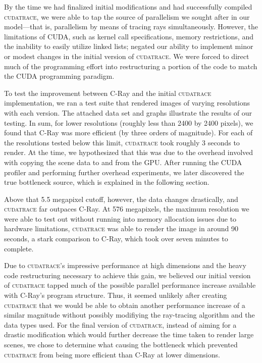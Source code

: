 \documentclass[12pt]{article}
\begin{document}
By the time we had finalized initial modifications and had successfully compiled \textsc{cudatrace}, we were able to tap the source of parallelism we sought after in our model---that is, parallelism by means of tracing rays simultaneously. However, the limitations of CUDA, such as kernel call specifications, memory restrictions, and the inability to easily utilize linked lists; negated our ability to implement minor or modest changes in the initial version of \textsc{cudatrace}. We were forced to direct much of the programming effort into restructuring a portion of the code to match the CUDA programming paradigm.

To test the improvement between C-Ray and the initial \textsc{cudatrace} implementation, we ran a test suite that rendered images of varying resolutions with each version. The attached data set and graphs illustrate the results of our testing. In sum, for lower resolutions (roughly less than 2400 by 2400 pixels), we found that C-Ray was more efficient (by three orders of magnitude). For each of the resolutions tested below this limit, \textsc{cudatrace} took roughly 3 seconds to render. At the time, we hypothesized that this was due to the overhead involved with copying the scene data to and from the GPU. After running the CUDA profiler and performing further overhead experiments, we later discovered the true bottleneck source, which is explained in the following section. 


Above that 5.5 megapixel cutoff, however, the data changes drastically, and \textsc{cudatrace} far outpaces C-Ray. At 576 megapixels, the maximum resolution we were able to test out without running into memory allocation issues due to hardware limitations, \textsc{cudatrace} was able to render the image in around 90 seconds, a stark comparison to C-Ray, which took over seven minutes to complete. 


Due to \textsc{cudatrace}'s impressive performance at high dimensions and the heavy code restructuring necessary to achieve this gain, we believed our initial version of \textsc{cudatrace} tapped much of the possible parallel performance increase available with C-Ray's program structure. Thus, it seemed unlikely after creating \textsc{cudatrace} that we would be able to obtain another performance increase of a similar magnitude without possibly modifiying the ray-tracing algorithm and the data types used. For the final version of \textsc{cudatrace}, instead of aiming for a drastic modification which would further decrease the time taken to render large scenes, we chose to determine what causing the bottleneck which prevented \textsc{cudatrace} from being more efficient than C-Ray at lower dimensions.
\end{document}
